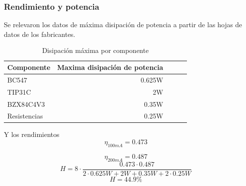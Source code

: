 \subsubsection{Rendimiento y potencia}
Se relevaron los datos de máxima disipación de potencia a partir de las hojas de datos de los fabricantes.


\begin{table}[H]
	\centering
	\begin{tabular}{@{}lrlll@{}}
		\toprule
		\multicolumn{1}{c}{\textbf{Componente}} & \multicolumn{1}{c}{\textbf{Maxima disipación de potencia}} &  &  &  \\ \midrule
		BC547        & 0.625W &  &  &  \\
		TIP31C       & 2W     &  &  &  \\
		BZX84C4V3    & 0.35W  &  &  &  \\ 
		Resistencias & 0.25W  &  &  &  \\ \bottomrule
	\end{tabular}
	\caption{Disipación máxima por componente}
	\label{tab:acqCap}
\end{table}


Y los rendimientos
$$\eta_{100mA} = 0.473$$

$$\eta_{200mA} = 0.487$$
\begin{equation}
H = 8 \cdot \frac{0.473 \cdot 0.487}{2\cdot 0.625W+2W+0.35W+2\cdot0.25W}
\end{equation}
\begin{equation}
	H = 44.9\%
\end{equation}




